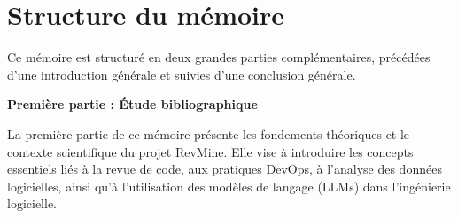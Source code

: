 



\section{Structure du mémoire}

Ce mémoire est structuré en deux grandes parties complémentaires, précédées d’une introduction générale et suivies d’une conclusion générale.

\textbf{Première partie : Étude bibliographique}

La première partie de ce mémoire présente les fondements théoriques et le contexte scientifique du projet RevMine. Elle vise à introduire les concepts essentiels liés à la revue de code, aux pratiques DevOps, à l’analyse des données logicielles, ainsi qu’à l’utilisation des modèles de langage (LLMs) dans l’ingénierie logicielle.

